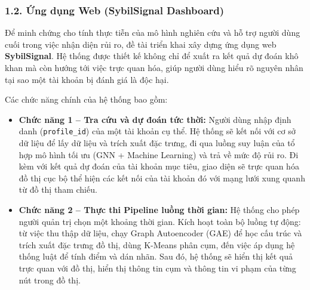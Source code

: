 \subsubsection{1.2. Ứng dụng Web (SybilSignal Dashboard)}
\indent\indent Để minh chứng cho tính thực tiễn của mô hình nghiên cứu và hỗ trợ người dùng cuối trong việc nhận diện rủi ro, đề tài triển khai xây dựng ứng dụng web \textbf{SybilSignal}. Hệ thống được thiết kế không chỉ để xuất ra kết quả dự đoán khô khan mà còn hướng tới việc trực quan hóa, giúp người dùng hiểu rõ nguyên nhân tại sao một tài khoản bị đánh giá là độc hại.\vspace{0.3cm}

Các chức năng chính của hệ thống bao gồm:\vspace{-0.1cm}
\begin{itemize}[label={--}, itemsep=1pt]
    \item \textbf{Chức năng 1 -- Tra cứu và dự đoán tức thời:} Người dùng nhập định danh (\texttt{profile\_id}) của một tài khoản cụ thể. Hệ thống sẽ kết nối với cơ sở dữ liệu để lấy dữ liệu và trích xuất đặc trưng, đi qua luồng suy luận của tổ hợp mô hình tối ưu (GNN + Machine Learning) và trả về mức độ rủi ro. Đi kèm với kết quả dự đoán của tài khoản mục tiêu, giao diện sẽ trực quan hóa đồ thị cục bộ thể hiện các kết nối của tài khoản đó với mạng lưới xung quanh từ đồ thị tham chiếu.
    \item \textbf{Chức năng 2 -- Thực thi Pipeline luồng thời gian:} Hệ thống cho phép người quản trị chọn một khoảng thời gian. Kích hoạt toàn bộ luồng tự động: từ việc thu thập dữ liệu, chạy Graph Autoencoder (GAE) để học cấu trúc và trích xuất đặc trưng đồ thị, dùng K-Means phân cụm, đến việc áp dụng hệ thống luật để tính điểm và dán nhãn. Sau đó, hệ thống sẽ hiển thị kết quả trực quan với đồ thị, hiển thị thông tin cụm và thông tin vi phạm của từng nút trong đồ thị.
\end{itemize}